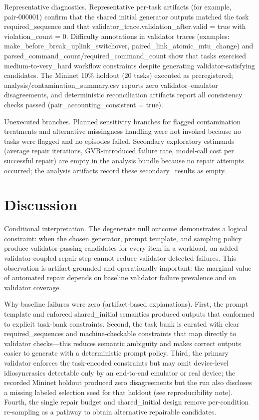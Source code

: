 \documentclass[conference]{IEEEtran}
\begin{document}
Representative diagnostics. Representative per‑task artifacts (for example, pair‑000001) confirm that the shared initial generator outputs matched the task required\_sequence and that validator\_trace.validation\_after.valid = true with violation\_count = 0. Difficulty annotations in validator traces (examples: make\_before\_break\_uplink\_switchover, paired\_link\_atomic\_mtu\_change) and parsed\_command\_count/required\_command\_count show that tasks exercised medium‑to‑very\_hard workflow constraints despite generating validator‑satisfying candidates. The Mininet 10\% holdout (20 tasks) executed as preregistered; analysis/contamination\_summary.csv reports zero validator--emulator disagreements, and deterministic reconciliation artifacts report all consistency checks passed (pair\_accounting\_consistent = true).

Unexecuted branches. Planned sensitivity branches for flagged contamination treatments and alternative missingness handling were not invoked because no tasks were flagged and no episodes failed. Secondary exploratory estimands (average repair iterations, GVR‑introduced failure rate, model‑call cost per successful repair) are empty in the analysis bundle because no repair attempts occurred; the analysis artifacts record these secondary\_results as empty.

\section{Discussion}
Conditional interpretation. The degenerate null outcome demonstrates a logical constraint: when the chosen generator, prompt template, and sampling policy produce validator‑passing candidates for every item in a workload, an added validator‑coupled repair step cannot reduce validator‑detected failures. This observation is artifact‑grounded and operationally important: the marginal value of automated repair depends on baseline validator failure prevalence and on validator coverage.

Why baseline failures were zero (artifact‑based explanations). First, the prompt template and enforced shared\_initial semantics produced outputs that conformed to explicit task‑bank constraints. Second, the task bank is curated with clear required\_sequences and machine‑checkable constraints that map directly to validator checks---this reduces semantic ambiguity and makes correct outputs easier to generate with a deterministic prompt policy. Third, the primary validator enforces the task‑encoded constraints but may omit device‑level idiosyncrasies detectable only by an end‑to‑end emulator or real device; the recorded Mininet holdout produced zero disagreements but the run also discloses a missing labeled selection seed for that holdout (see reproducibility note). Fourth, the single repair budget and shared\_initial design remove per‑condition re‑sampling as a pathway to obtain alternative repairable candidates.
\end{document}
